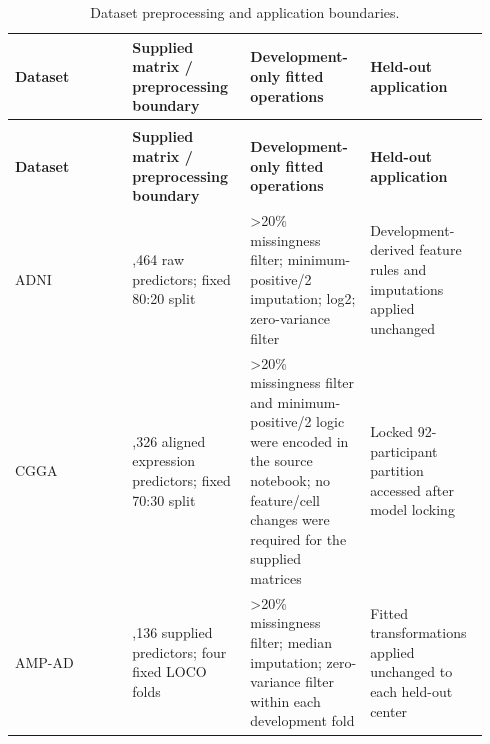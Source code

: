 {
\small
\renewcommand{\arraystretch}{1.08}
\setlength{\tabcolsep}{2.2pt}
\begin{longtable}{@{}>{\raggedright\arraybackslash}p{0.2350\linewidth}>{\centering\arraybackslash}p{0.2350\linewidth}>{\centering\arraybackslash}p{0.2350\linewidth}>{\raggedright\arraybackslash}p{0.2350\linewidth}@{}}
\caption{Dataset preprocessing and application boundaries.}\label{tab:supp1}\\
\toprule
\bfseries Dataset & \bfseries Supplied matrix / preprocessing boundary & \bfseries Development-only fitted operations & \bfseries Held-out application \\
\midrule
\endfirsthead
\multicolumn{4}{l}{\footnotesize\itshape \tablename~\thetable\ (continued)}\\
\toprule
\bfseries Dataset & \bfseries Supplied matrix / preprocessing boundary & \bfseries Development-only fitted operations & \bfseries Held-out application \\
\midrule
\endhead
\bottomrule
\endfoot
ADNI & 7,464 raw predictors; fixed 80:20 split & >20\% missingness filter; minimum-positive/2 imputation; log2; zero-variance filter & Development-derived feature rules and imputations applied unchanged \\
CGGA & 24,326 aligned expression predictors; fixed 70:30 split & >20\% missingness filter and minimum-positive/2 logic were encoded in the source notebook; no feature/cell changes were required for the supplied matrices & Locked 92-participant partition accessed after model locking \\
AMP-AD & 13,136 supplied predictors; four fixed LOCO folds & >20\% missingness filter; median imputation; zero-variance filter within each development fold & Fitted transformations applied unchanged to each held-out center \\
\end{longtable}
}
